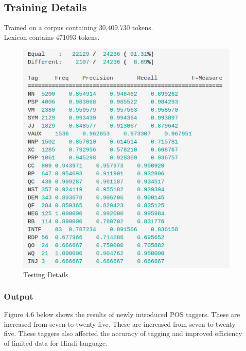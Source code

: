 \documentclass[12pt,a4paper,oneside]{memoir}
\begin{document}
\subsection{Training Details}
Trained on a corpus containing 30,409,730 tokens.\\
Lexicon contains 471093 tokens.\\

\begin{figure}[h]
    \centering
    \includegraphics[scale=0.5]{jagjit6}
    \caption{Testing Details}
\end{figure}


\subsubsection{Output}
Figure 4.6 below shows the results of newly introduced POS taggers. These are increased from seven to twenty five. These are increased from seven to twenty five. These taggers also affected the accuracy of tagging and improved efficiency of limited data for Hindi language.
\end{document}
